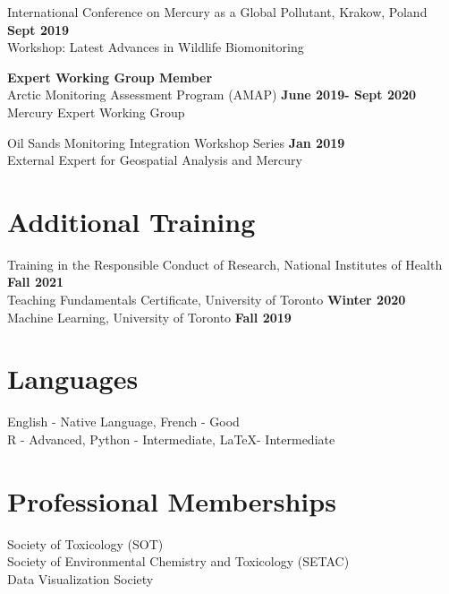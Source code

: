 \documentclass[margin,line]{res}
\begin{document}
\begin{resume}
International Conference on Mercury as a Global Pollutant, Krakow, Poland \hfill {\bf Sept 2019}\\
Workshop: Latest Advances in Wildlife Biomonitoring

{\bf Expert Working Group Member}\\
Arctic Monitoring Assessment Program (AMAP)
\hfill {\bf  June 2019- Sept 2020}\\
Mercury Expert Working Group

Oil Sands Monitoring Integration Workshop Series
\hfill {\bf  Jan 2019}\\
External Expert for Geospatial Analysis and Mercury

\vspace*{.1in}

\section{\sc Additional Training}
Training in the Responsible Conduct of Research, National Institutes of Health \hfill {\bf  Fall 2021}\\
Teaching Fundamentals Certificate, University of Toronto
\hfill {\bf  Winter 2020}\\
Machine Learning, University of Toronto
\hfill {\bf  Fall 2019}

\vspace*{.1in}

\section{\sc Languages}

English - Native Language, French - Good\\
R - Advanced, Python - Intermediate, LaTeX- Intermediate

\vspace*{.1in}

\section{\sc Professional Memberships}
Society of Toxicology (SOT)\\
Society of Environmental Chemistry and Toxicology (SETAC)\\
Data Visualization Society\\


\end{resume}
\end{document}
